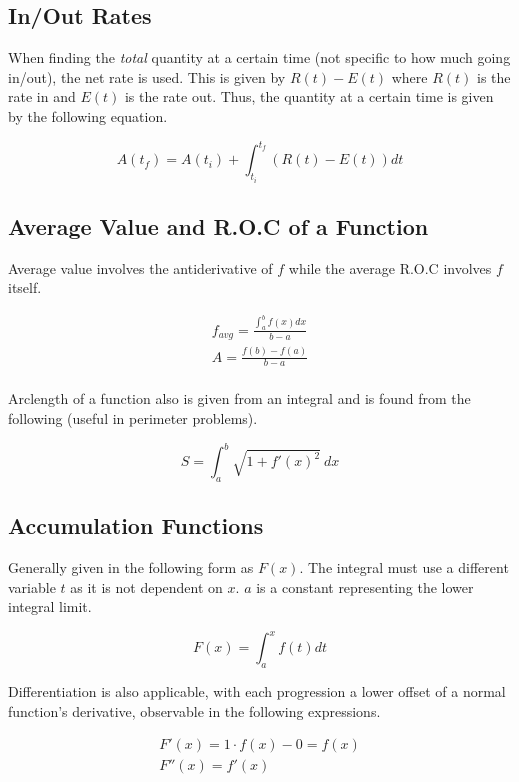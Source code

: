 \subsection{In/Out Rates}\label{subsec:in/out-rates}

When finding the \emph{total} quantity at a certain time (not specific to how much going in/out), the net rate is used.
This is given by $R(t)-E(t)$ where $R(t)$ is the rate in and $E(t)$ is the rate out.
Thus, the quantity at a certain time is 
given by the following equation. 

\[A(t_f)=A(t_i)+\int_{t_i}^{t_f}(R(t)-E(t))dt\]

\subsection{Average Value and R.O.C of a Function}\label{subsec:average-value-and-r.o.c-of-a-function}

Average value involves the antiderivative of $f$ while the average R.O.C involves $f$ itself.

\begin{gather*}
    f_{avg}=\frac{\int_{a}^{b}f(x)dx}{b-a}\\
    A=\frac{f(b)-f(a)}{b-a}\\
\end{gather*}

Arclength of a function also is given from an integral and is found from the following (useful in perimeter problems).

\[S=\int_{a}^{b}\sqrt{1+f'(x)^2}\:dx\]

\subsection{Accumulation Functions}\label{subsec:accumulation-functions}

Generally given in the following form as $F(x)$.
The integral must use a different variable 
$t$ as it is not dependent on $x$. $a$ is a constant representing the lower integral limit.

\[F(x)=\int_{a}^{x}f(t)dt\]

Differentiation is also applicable, with each progression a lower offset of a normal function's derivative, observable in the following expressions.

\begin{gather*}
    F'(x)=1\cdot{f(x)}-0=f(x)\\
    F''(x)=f'(x)\\
\end{gather*}

